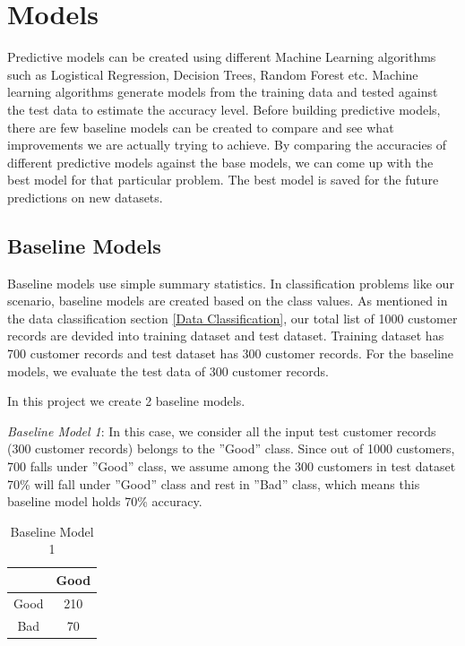 \documentclass[sigconf]{acmart}
\begin{document}
\section{Models}

Predictive models can be created using different Machine Learning algorithms such as Logistical Regression, Decision Trees, Random Forest etc. Machine learning algorithms generate models from the training data and tested against the test data to estimate the accuracy level. Before building predictive models, there are few baseline models can be created to compare and see what improvements we are actually trying to achieve. By comparing the accuracies of different predictive models against the base models, we can come up  with the best model for that particular problem. The best model is saved for the future predictions on new datasets.

\subsection{Baseline Models}

Baseline models use simple summary statistics. In classification problems like our scenario, baseline models are created based on the class values. As mentioned in the data classification section \ref{Data Classification}, our total list of 1000 customer records are devided into training dataset and test dataset. Training dataset has 700 customer records and test dataset has 300 customer records. For the baseline models, we evaluate the test data of 300 customer records.

In this project we create 2 baseline models. 

\textit{Baseline Model 1}: In this case, we consider all the input test customer records (300 customer records) belongs to the ''Good'' class. Since out of 1000 customers, 700 falls under ''Good'' class, we assume among the 300 customers in test dataset 70\% will fall under ''Good'' class and rest in ''Bad'' class, which means this baseline model holds 70\% accuracy. 

\begin{table}
  \caption{Baseline Model 1}
  \label{tab:table2}
  \begin{tabular}{cc}
    \toprule
     & Good\\
    \midrule
    Good& 210\\
    Bad& 70\\
    \bottomrule
  \end{tabular}
\end{table}
\end{document}

